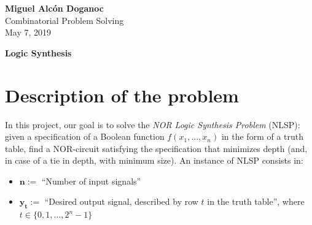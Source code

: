 \documentclass[letterpaper,10pt]{article}
\begin{document}
\noindent
\begin{flushright}
    \large\textbf{Miguel Alcón Doganoc} \\
    Combinatorial Problem Solving \\
    May 7, 2019
\end{flushright}

\newcommand{\code}[1]{\texttt{#1}}

\noindent
{\huge{\textbf{Logic Synthesis}}}

\section{Description of the problem}
In this project, our goal is to solve the \textit{NOR Logic Synthesis Problem}
(NLSP): given a specification of a Boolean function $f(x_1,...,x_n)$ in the form of a truth table, find a NOR-circuit satisfying the specification that minimizes depth (and, in case of a tie in depth, with minimum size). An instance of NLSP consists in:
\begin{itemize}
    \item $\mathbf{n} := $ ``Number of input signals''
    \item $\mathbf{y_t} := $ ``Desired output signal, described by row $t$ in the truth table'', where $t \in \{0,1,...,2^n-1\}$  
\end{itemize}
\end{document}
